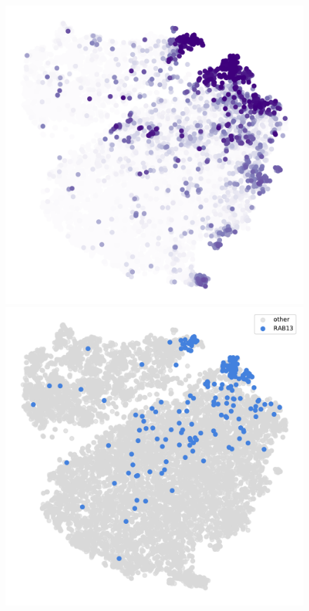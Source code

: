 \begin{figure}[h]
	\endminipage\hfill
		\includegraphics[width=\linewidth]{figures/appendix/tsne_probability_nocolorbar_protrusion}
		\vfill
		\includegraphics[width=\linewidth]{figures/appendix/tsne_protrusion_RAB13}

\end{figure}
